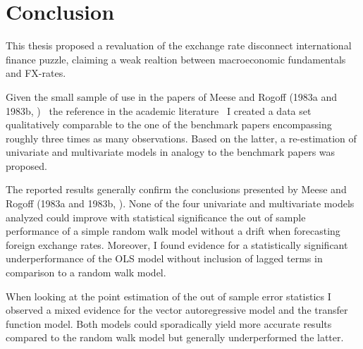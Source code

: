 \section{Conclusion}
\label{sec:conclusion}

This thesis proposed a revaluation of the exchange rate disconnect
international finance puzzle, claiming a weak realtion between
macroeconomic fundamentals and FX-rates.

Given the small sample of use in the papers of Meese and Rogoff (1983a
and 1983b, \cite{MeeseRogoffa, MeeseRogoffb}) \textendash \ the reference in the
academic literature \textendash \ I created a data set qualitatively comparable to
the one of the benchmark papers encompassing roughly three times as
many observations. Based on the latter, a re-estimation of univariate
and multivariate models in analogy to the benchmark papers was proposed.

The reported results generally confirm the conclusions presented by
Meese and Rogoff (1983a and 1983b, \cite{MeeseRogoffa, MeeseRogoffb}).
None of the four univariate and multivariate models analyzed could
improve with statistical significance the out of sample performance of
a simple random walk model without a drift when forecasting foreign
exchange rates. Moreover, I found evidence for a statistically
significant underperformance of the OLS model without inclusion of
lagged terms in comparison to a random walk model.

When looking at the point estimation of the out of sample error
statistics I observed a mixed evidence for the vector autoregressive
model and the transfer function model. Both models could sporadically
yield more accurate results compared to the random walk model but
generally underperformed the latter.

